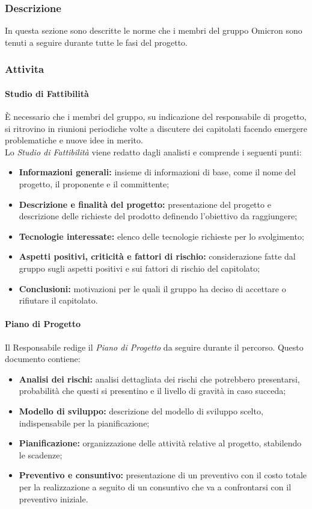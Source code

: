 \subsubsection{Descrizione}
In questa sezione sono descritte le norme che i membri del gruppo Omicron sono tenuti a seguire durante tutte le fasi del progetto.
\subsubsection{Attivita}
\paragraph{Studio di Fattibilità}
È necessario che i membri del gruppo, su indicazione del responsabile di progetto,  si ritrovino in riunioni periodiche volte a discutere dei capitolati facendo emergere problematiche e nuove idee in merito.\\
Lo \textit{Studio di Fattibilità} viene redatto dagli analisti e comprende i seguenti punti:
\begin{itemize}
    \item \textbf{Informazioni generali:} insieme di informazioni di base, come il nome del progetto, il proponente e il committente;
    \item \textbf{Descrizione e finalità del progetto:} presentazione del progetto e descrizione delle richieste del prodotto definendo l'obiettivo da raggiungere;
    \item \textbf{Tecnologie interessate:} elenco delle tecnologie richieste per lo svolgimento;
    \item \textbf{Aspetti positivi, criticità e fattori di rischio:} considerazione fatte dal gruppo sugli aspetti positivi e sui fattori di rischio del capitolato;
    \item \textbf{Conclusioni:} motivazioni per le quali il gruppo ha deciso di accettare o rifiutare il capitolato.
\end{itemize}
\paragraph{Piano di Progetto} Il Responsabile redige il \textit{Piano di Progetto} da seguire durante il percorso. Questo documento contiene:
\begin{itemize}
    \item \textbf{Analisi dei rischi:} analisi dettagliata dei rischi che potrebbero presentarsi, probabilità che questi si presentino e il livello di gravità in caso succeda;
    
    \item \textbf{Modello di sviluppo:} descrizione del modello di sviluppo scelto, indispensabile per la pianificazione;
    
    \item \textbf{Pianificazione:} organizzazione delle attività relative al progetto, stabilendo le scadenze;
    
    \item \textbf{Preventivo e consuntivo:} presentazione di un preventivo con il costo totale per la realizzazione a seguito di un consuntivo che va a confrontarsi con il preventivo iniziale.
\end{itemize}

